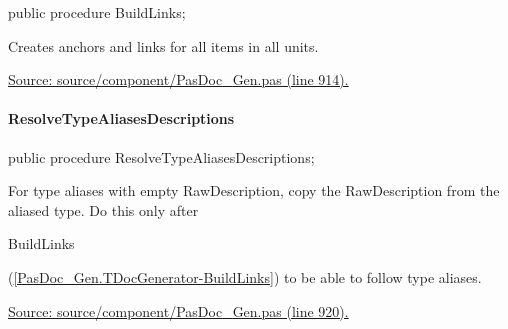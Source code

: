 \documentclass{report}
\newif\ifpdf
\begin{document}
\label{PasDoc_Gen.TDocGenerator-BuildLinks}
\begin{list}{}{
\setlength{\itemindent}{0cm}
\setlength{\listparindent}{0cm}
\setlength{\leftmargin}{\evensidemargin}
\addtolength{\leftmargin}{\tmplength}
\settowidth{\labelsep}{X}
\addtolength{\leftmargin}{\labelsep}
\setlength{\labelwidth}{\tmplength}
}
\item[\textbf{Declaration}\hfill]
\ifpdf
\begin{flushleft}
\fi
\begin{ttfamily}
public procedure BuildLinks;\end{ttfamily}

\ifpdf
\end{flushleft}
\fi

\par
\item[\textbf{Description}]
Creates anchors and links for all items in all units.\par
\href{https://github.com/pasdoc/pasdoc/blob/master/source/component/PasDoc_Gen.pas#L914}{Source: source/component/PasDoc{\_}Gen.pas (line 914).}

\end{list}
\paragraph*{ResolveTypeAliasesDescriptions}\hspace*{\fill}

\label{PasDoc_Gen.TDocGenerator-ResolveTypeAliasesDescriptions}
\begin{list}{}{
\setlength{\itemindent}{0cm}
\setlength{\listparindent}{0cm}
\setlength{\leftmargin}{\evensidemargin}
\addtolength{\leftmargin}{\tmplength}
\settowidth{\labelsep}{X}
\addtolength{\leftmargin}{\labelsep}
\setlength{\labelwidth}{\tmplength}
}
\item[\textbf{Declaration}\hfill]
\ifpdf
\begin{flushleft}
\fi
\begin{ttfamily}
public procedure ResolveTypeAliasesDescriptions;\end{ttfamily}

\ifpdf
\end{flushleft}
\fi

\par
\item[\textbf{Description}]
For type aliases with empty RawDescription, copy the RawDescription from the aliased type. Do this only after \begin{ttfamily}BuildLinks\end{ttfamily}(\ref{PasDoc_Gen.TDocGenerator-BuildLinks}) to be able to follow type aliases.\par
\href{https://github.com/pasdoc/pasdoc/blob/master/source/component/PasDoc_Gen.pas#L920}{Source: source/component/PasDoc{\_}Gen.pas (line 920).}

\end{list}
\end{document}

